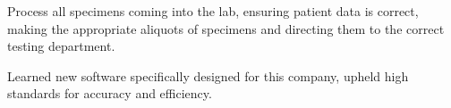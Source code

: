 \documentclass[letterpaper]{resume}
\begin{document}
\begin{compactitem}
\item Process all specimens coming into the lab, ensuring patient data is correct, making the appropriate aliquots of specimens and directing them to the correct testing department.
\item Learned new software specifically designed for this company, upheld high standards for accuracy and efficiency.
\end{compactitem}



\end{document}
